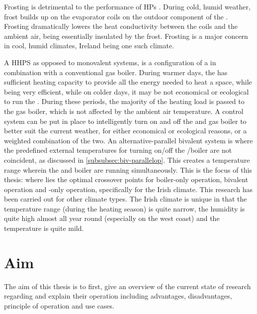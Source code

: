 Frosting is detrimental to the performance of \acp{HP} \cite{di_perna_experimental_2015}. During cold, humid weather, frost builds up on the evaporator coils on the outdoor component of the \HP. Frosting dramatically lowers the heat conductivity between the coils and the ambient air, being essentially insulated by the frost. Frosting is a major concern in cool, humid climates, Ireland being one such climate.

A \ac{HHPS} as opposed to monovalent systems, is a configuration of a \HP in combination with a conventional gas boiler. During warmer days, the \HP has sufficient heating capacity to provide all the energy needed to heat a space, while being very efficient, while on colder days, it may be not economical or ecological to run the \HP. During these periods, the majority of the heating load is passed to the gas boiler, which is not affected by the ambient air temperature. A control system can be put in place to intelligently turn on and off the \HP and gas boiler to better suit the current weather, for either economical or ecological reasons, or a weighted combination of the two. An alternative-parallel bivalent system is where the predefined external temperatures for turning on/off the \HP/boiler are not coincident, as discussed in \cref{subsubsec:biv-parallelop}. This creates a temperature range wherein the \HP and boiler are running simultaneously. This is the focus of this thesis: where lies the optimal crossover points for boiler-only operation, bivalent operation and \HP-only operation, specifically for the Irish climate. This research has been carried out for other climate types. The Irish climate is unique in that the temperature range (during the heating season) is quite narrow, the humidity is quite high almost all year round (especially on the west coast) and the temperature is quite mild.  

\section{Aim}
The aim of this thesis is to first, give an overview of the current state of research regarding \HPs and explain their operation including advantages, disadvantages, principle of operation and use cases. 

